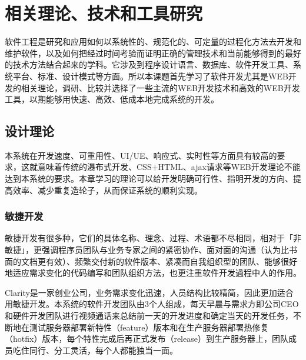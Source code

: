 
\chapter{相关理论、技术和工具研究}
\label{chap:web_dev}
软件工程是研究和应用如何以系统性的、规范化的、可定量的过程化方法去开发和维护软件\supercite{radatz1990ieee}，以及如何把经过时间考验而证明正确的管理技术和当前能够得到的最好的技术方法结合起来的学科。它涉及到程序设计语言、数据库、软件开发工具、系统平台、标准、设计模式等方面。所以本课题首先学习了软件开发尤其是WEB开发的相关理论，调研、比较并选择了一些主流的WEB开发技术和高效的WEB开发工具，以期能够用快速、高效、低成本地完成系统的开发。
\section{设计理论}
本系统在开发速度、可重用性、UI/UE、响应式、实时性等方面具有较高的要求，这就意味着传统的瀑布式开发、CSS+HTML、ajax请求等WEB开发理论不能达到本系统的要求。本章学习的理论可以给开发明确可行性、指明开发的方向、提高效率、减少重复造轮子，从而保证系统的顺利实现。
\subsection{敏捷开发}
敏捷开发有很多种，它们的具体名称、理念、过程、术语都不尽相同，相对于「非敏捷」，更强调程序员团队与业务专家之间的紧密协作、面对面的沟通（认为比书面的文档更有效）、频繁交付新的软件版本、紧凑而自我组织型的团队、能够很好地适应需求变化的代码编写和团队组织方法，也更注重软件开发過程中人的作用。\supercite{beck2013agile}

Clarity是一家创业公司，业务需求变化迅速，人员结构比较精简，因此更加适合用敏捷开发。本系统的软件开发团队由3个人组成，每天早晨与需求方即公司CEO和硬件开发团队进行视频通话来总结前一天的开发进度和确定当天的开发任务，不断地在测试服务器部署新特性（feature）版本和在生产服务器部署热修复（hotfix）版本，每个特性完成后再正式发布（release）到生产服务器上，团队成员吃住同行、分工灵活，每个人都能独当一面。
